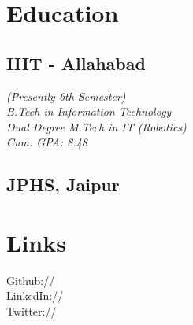 \documentclass[]{deedy-resume-openfont}
\begin{document}
%
%
\lastupdated

%
%




%
%

\begin{minipage}[t]{0.33\textwidth} 


\section{Education} 

\subsection{IIIT - Allahabad}
\textit{(Presently 6th Semester)\\B.Tech in Information Technology\\ Dual Degree M.Tech in IT (Robotics) \\ Cum. GPA: 8.48}
\sectionsep

\subsection{JPHS, Jaipur}
\sectionsep


\section{Links} 
Github:// \href{https://github.com/Ellusionists}{} \\
LinkedIn://  \href{https://www.linkedin.com/in/aditya-goel-11a578134/}{} \\
Twitter://  \href{https://twitter.com/itsAdityaGoel}{} \\
\sectionsep


\end{minipage}
\end{document}
